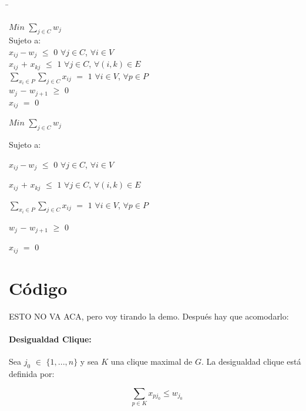 \documentclass[a4paper]{article}
\begin{document}
\begin{tabbing}

\hspace*{4cm} \= \hspace*{4cm} \kill

$Min$ $ \sum_{j\in C} w_j$ \> \\

Sujeto a:\> \\

$x_{ij} - w_j$ $\leq$ $0$\>   $\forall j \in C$, $\forall i \in V$\\

$x_{ij}$ $+$ $x_{kj}$ $\leq$ $1$ \>  $\forall j \in C$, $\forall (i,k) \in E$\\

$\sum_{x_i \in P} \sum_{j \in C} x_{ij}$ $=$ $1$ \> $\forall i \in V$, $\forall p \in P$\\

$w_j$ $-$ $w_{j+1}$ $\geq$ $0$\> \\

$x_{ij}$ $=$ $0$ \> \\

\end{tabbing}

$Min$ $ \sum_{j\in C} w_j$

Sujeto a:

$x_{ij} - w_j$ $\leq$ $0$   $\forall j \in C$, $\forall i \in V$

$x_{ij}$ $+$ $x_{kj}$ $\leq$ $1$   $\forall j \in C$, $\forall (i,k) \in E$

$\sum_{x_i \in P} \sum_{j \in C} x_{ij}$ $=$ $1$  $\forall i \in V$, $\forall p \in P$

$w_j$ $-$ $w_{j+1}$ $\geq$ $0$

$x_{ij}$ $=$ $0$


\newpage

\section{Código}

ESTO NO VA ACA, pero voy tirando la demo. Después hay que acomodarlo:

\paragraph{Desigualdad Clique:} Sea $j_0$ $\in$ $ \{ 1,...,n \} $ y sea $K$ una clique maximal de $G$. La desigualdad clique está definida por:

\begin{equation} \label{eq:des1}
\sum_{p \in K} x_{pj_0} \leq w_{j_0}
\end{equation}
\end{document}

